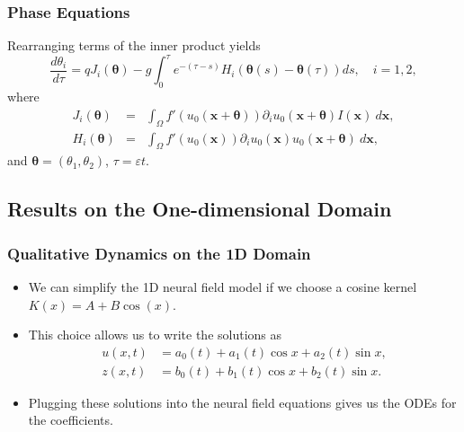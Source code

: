 \documentclass{beamer}
\newcommand{\x}{\mathbf{x}}
\newcommand{\q}{\boldsymbol{\theta}}
\newcommand{\io}{\int_\Omega}
\newcommand{\ve}{\varepsilon}
\newcommand{\pa}{\partial}
\begin{document}
\begin{frame}
\frametitle{Phase Equations}
Rearranging terms of the inner product yields
\begin{equation*}
\frac{d\theta_i}{d\tau} = qJ_i(\q) -g\int_0^\tau e^{-(\tau-s)} H_i(\q(s)-\q(\tau))ds, \quad i=1,2,
\end{equation*}
where
\begin{eqnarray*}
J_i(\q) &=& \io f'(u_0(\x+\q))\pa_i u_0(\x+\q)I(\x)\ d\x,\\
H_i(\q) &=& \io f'(u_0(\x))\pa_i u_0(\x) u_0(\x+\q)\ d\x,
\end{eqnarray*} 
and $\q = (\theta_1,\theta_2)$, $\tau = \ve t$.
 
\end{frame}

\subsection{Results on the One-dimensional Domain}


\begin{frame}
\frametitle{Qualitative Dynamics on the 1D Domain}
\begin{itemize}
 \item<1-> We can simplify the 1D neural field model if we choose a cosine kernel $K(x) = A + B\cos(x)$.
 \item<2-> This choice allows us to write the solutions as
\begin{align*}
 u(x,t) &= a_0(t) + a_1(t) \cos x + a_2(t) \sin x,\\
 z(x,t) &= b_0(t) + b_1(t) \cos x + b_2(t) \sin x.
\end{align*}
 \item<3-> Plugging these solutions into the neural field equations gives us the ODEs for the coefficients.
\end{itemize}

\end{frame}
\end{document}
